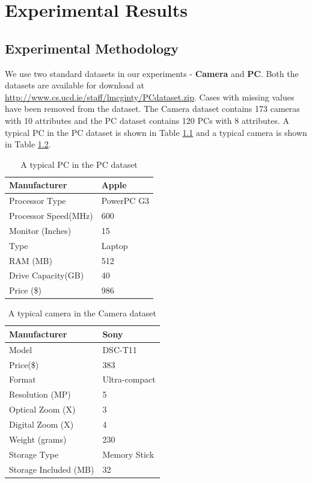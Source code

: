 \chapter{Experimental Results}
\section{Experimental Methodology}

We use two standard datasets in our experiments - \textbf{Camera} and \textbf{PC}.
Both the datasets are available for download at \url{http://www.cs.ucd.ie/staff/lmcginty/PCdataset.zip}.
Cases with missing values have been removed from the dataset.
The Camera dataset contains 173 cameras with 10 attributes and the PC dataset contains 120 PCs with 8 attributes.
A typical PC in the PC dataset is shown in Table \ref{tab:pc} and a typical camera is shown in Table \ref{tab:camera}.


\begin{table}
\caption{A typical PC in the PC dataset}
\centering
\renewcommand{\arraystretch}{1.2}
\label{tab:pc}

\begin{tabular}{|l|l|}
\hline
Manufacturer & Apple \\
\hline
Processor Type & PowerPC G3 \\
\hline
Processor Speed(MHz) & 600 \\
\hline
Monitor (Inches) & 15 \\
\hline
Type & Laptop \\ 
\hline
RAM (MB) & 512 \\
\hline
Drive Capacity(GB) & 40 \\
\hline
Price (\$) & 986\\
\hline
\end{tabular}
\end{table}

\begin{table}
\caption{A typical camera in the Camera dataset}
\centering
\renewcommand{\arraystretch}{1.2}
\label{tab:camera}

\begin{tabular}{|l|l|}
\hline
Manufacturer & Sony \\
\hline
Model & DSC-T11 \\
\hline
Price(\$) & 383\\
\hline
Format & Ultra-compact\\
\hline
Resolution (MP)  &5\\
\hline
Optical Zoom (X) &3 \\
\hline
Digital Zoom (X) &4\\
\hline
Weight (grams) &230\\
\hline
Storage Type & Memory Stick\\
\hline
Storage Included (MB)& 32\\
\hline
\end{tabular}
\end{table}

